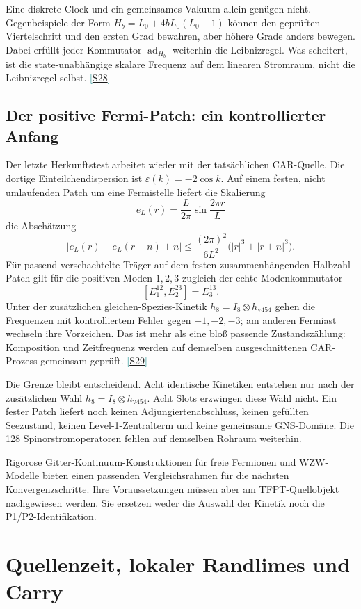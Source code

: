 \documentclass[11pt,a4paper,oneside,parskip=half,headings=normal,numbers=noenddot,bibliography=totoc]{scrreprt}
\newcommand{\src}[1]{\textcolor{teal}{\small[\hyperref[s:#1]{S#1}]}}
\begin{document}
Eine diskrete Clock und ein gemeinsames Vakuum allein genügen nicht. Gegenbeispiele der Form $H_b=L_0+4bL_0(L_0-1)$ können den geprüften Viertelschritt und den ersten Grad bewahren, aber höhere Grade anders bewegen. Dabei erfüllt jeder Kommutator $\operatorname{ad}_{H_b}$ weiterhin die Leibnizregel. Was scheitert, ist die state-unabhängige skalare Frequenz auf dem linearen Stromraum, nicht die Leibnizregel selbst. \src{28}

\section{Der positive Fermi-Patch: ein kontrollierter Anfang}
Der letzte Herkunftstest arbeitet wieder mit der tatsächlichen CAR-Quelle. Die dortige Einteilchendispersion ist $\varepsilon(k)=-2\cos k$. Auf einem festen, nicht umlaufenden Patch um eine Fermistelle liefert die Skalierung
\[
 e_L(r)=\frac L{2\pi}\sin\frac{2\pi r}L
\]
die Abschätzung
\[
 \bigl|e_L(r)-e_L(r+n)+n\bigr|
 \le\frac{(2\pi)^2}{6L^2}\bigl(|r|^3+|r+n|^3\bigr).
\]
Für passend verschachtelte Träger auf dem festen zusammenhängenden Halbzahl-Patch gilt für die positiven Moden $1,2,3$ zugleich der echte Modenkommutator
\[
 [E^{12}_1,E^{23}_2]=E^{13}_3.
\]
Unter der zusätzlichen gleichen-Spezies-Kinetik $h_8=I_8\otimes h_{\mathrm{v454}}$ gehen die Frequenzen mit kontrolliertem Fehler gegen $-1,-2,-3$; am anderen Fermiast wechseln ihre Vorzeichen. Das ist mehr als eine bloß passende Zustandszählung: Komposition und Zeitfrequenz werden auf demselben ausgeschnittenen CAR-Prozess gemeinsam geprüft. \src{29}

Die Grenze bleibt entscheidend. Acht identische Kinetiken entstehen nur nach der zusätzlichen Wahl $h_8=I_8\otimes h_{\mathrm{v454}}$. Acht Slots erzwingen diese Wahl nicht. Ein fester Patch liefert noch keinen Adjungiertenabschluss, keinen gefüllten Seezustand, keinen Level-1-Zentralterm und keine gemeinsame GNS-Domäne. Die 128 Spinorstromoperatoren fehlen auf demselben Rohraum weiterhin.

Rigorose Gitter-Kontinuum-Konstruktionen für freie Fermionen und WZW-Modelle bieten einen passenden Vergleichsrahmen für die nächsten Konvergenzschritte. Ihre Voraussetzungen müssen aber am TFPT-Quellobjekt nachgewiesen werden. Sie ersetzen weder die Auswahl der Kinetik noch die P1/P2-Identifikation. \cite{osborne}



\chapter{Quellenzeit, lokaler Randlimes und Carry}
\end{document}
